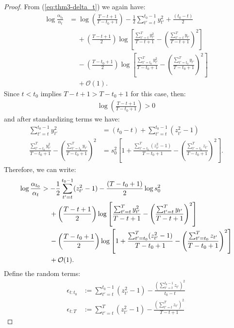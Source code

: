 \begin{proof}
From (\ref{eq:thm3-delta_t}) we again have:
\begin{align*}
    \log \frac{\alpha_{t_0}}{\alpha_t} &= \log \left(\frac{T - t + 1}{T - t_0 +1} \right) - \frac{1}{2} \sum_{t' = t}^{t_0 - 1} y_{t'}^2 + \frac{(t_0-t)}{2} \\
    &\quad\: + \left(\frac{T - t +1}{2}\right)\log\left[\frac{\sum_{t'=t}^T y_{t'}^2}{T-t+1} - \left(\frac{\sum_{t'=t}^T y_{t'}}{T-t+1}\right)^2 \right] \\
    &\quad\: -\left(\frac{T - t_0 +1}{2}\right)\log\left[\frac{\sum_{t'=t_0}^T y_{t'}^2}{T-t_0+1} - \left(\frac{\sum_{t'=t_0}^T y_{t'}}{T-t_0+1}\right)^2 \right] \\
    &\quad\: + \mathcal{O}(1).
\end{align*}
Since $t < t_0$ implies $T-t + 1> T-t_0 +1$ for this case, then:
\begin{align*}
    \log\left(\frac{T-t+1}{T-t_0+1}\right) > 0
\end{align*}
and after standardizing terms we have:
\small
\begin{align*}
    \sum_{t' = t}^{t_0 - 1} y_{t'}^2 &= (t_0-t) + \sum_{t' = t}^{t_0 - 1} (z_{t'}^2-1) \\
    \frac{\sum_{t'=t_0}^T y_{t'}^2}{T-t_0+1} - \left(\frac{\sum_{t'=t_0}^T y_{t'}}{T-t_0+1}\right)^2
    &= s_0^2 \left[1 + \frac{\sum_{t'=t_0}^T (z_{t'}^2-1)}{T-t_0+1} - \left(\frac{\sum_{t'=t_0}^T z_{t'}}{T-t_0+1}\right)^2\right]. 
\end{align*}
\normalsize
Therefore, we can write:
\small
\begin{align*}
    \log \frac{\alpha_{t_0}}{\alpha_t} &> - \frac{1}{2} \sum_{t' = t}^{t_0 - 1} (z_{t'}^2-1) - \frac{(T-t_0+1)}{2}\log s_0^2 \notag \\
    &\quad\: + \left(\frac{T - t +1}{2}\right)\log\left[\frac{\sum_{t'=t}^T y_{t'}^2}{T-t+1} - \left(\frac{\sum_{t'=t}^T y_{t'}}{T-t+1}\right)^2 \right] \notag \\
    &\quad\: -\left(\frac{T - t_0 +1}{2}\right)\log \left[1 + \frac{\sum_{t'=t_0}^T (z_{t'}^2-1)}{T-t_0+1} - \left(\frac{\sum_{t'=t_0}^T z_{t'}}{T-t_0+1}\right)^2\right] \notag \\
    &\quad\: + \mathcal{O}(1). 
\end{align*}
\normalsize
Define the random terms:
\begin{align}
    \epsilon_{t:t_0} &:=  \sum_{t'=t}^{t_0-1 } (z^2_{t'}-1) - \frac{\left(\sum_{t'=t}^{t_0-1 } z_{t'}\right)^2}{t_0-t} \label{eq:thm-3-error-t:t0} \\ 
    \epsilon_{t:T} &:= \sum_{t'=t}^{T} (z^2_{t'}-1)  - \frac{\left(\sum_{t'=t}^{T} z_{t'} \right)^2}{T-t+1} \label{eq:thm-3-error-t:T}

\end{align}
\end{proof}
